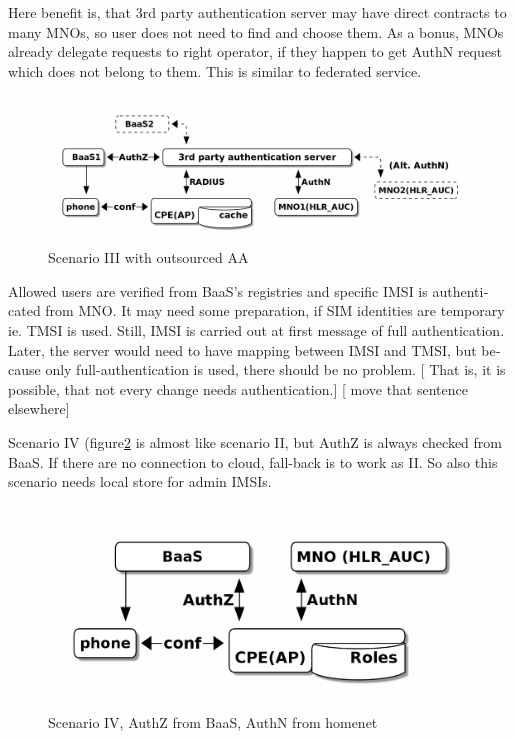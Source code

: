 \documentclass[12pt,a4paper,english]{tutthesis}
\begin{document}
\begin{otherlanguage}{english}
Here benefit is, that 3rd party authentication server may have direct
contracts to many MNOs, so user does not need to find and choose
them. As a bonus,  MNOs already delegate requests to right operator, if
they happen to get AuthN request which does not belong to them.
This is similar to federated service.

\begin{figure}[htb]
\centering
\includegraphics[width=.9\linewidth]{scenIII.png}
\caption{\label{fig:scenario-III}Scenario III with outsourced AA}
\end{figure}

Allowed users are verified from BaaS's registries and specific IMSI is
authenticated from MNO.  It may need some preparation, if SIM
identities are temporary ie. TMSI is used.  Still, IMSI is carried out at first message
of full authentication. Later, the server would need to have mapping
between IMSI and TMSI, but because only full-authentication is used,
there should be no problem.
[ That is, it is possible, that not every change needs
authentication.]
[ move that sentence elsewhere]


\label{scenario-iv} 


Scenario IV (figure\ref{fig:scenario-IV} is almost like scenario II, but
AuthZ is always checked from BaaS. If there are no connection to
cloud, fall-back is to work as II. So also this scenario needs local
store for admin IMSIs.

\begin{figure}[htb]
\centering
\includegraphics[width=.9\linewidth]{scenIV.png}
\caption{\label{fig:scenario-IV}Scenario IV, AuthZ from BaaS, AuthN from homenet}
\end{figure}


\end{otherlanguage}
\end{document}
